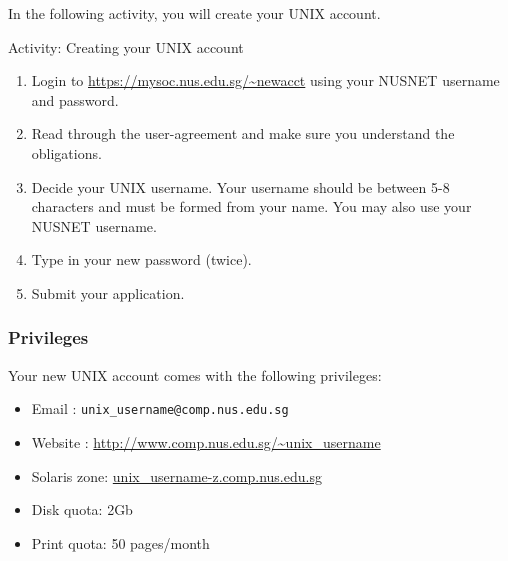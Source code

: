 \documentclass[a4paper]{beamer}
\newcommand{\ftitle}[1]{\frametitle<presentation>{#1}}
\begin{document}
In the following activity, you will create your UNIX account.  

\begin{frame}{Activity: Creating your UNIX account}
\begin{enumerate}
\item Login to \url{https://mysoc.nus.edu.sg/~newacct} using your NUSNET
username and password.  
\item Read through the user-agreement and make sure you understand the
obligations. 
\item Decide your UNIX username.  Your username should be between 5-8 characters and
must be formed from your name.  You may also use your NUSNET username. 
\item Type in your new password (twice).
\item Submit your application.
\end{enumerate}
\end{frame}

\begin{frame}
\ftitle{Privileges}
Your new UNIX account comes with the following privileges:
\begin{itemize}
\item Email : \texttt{unix\_username@comp.nus.edu.sg}
\item Website : \url{http://www.comp.nus.edu.sg/~unix_username}
\item Solaris zone: \url{unix_username-z.comp.nus.edu.sg}
\item Disk quota: 2Gb
\item Print quota: 50 pages/month
\end{itemize}
\end{frame}
\end{document}
